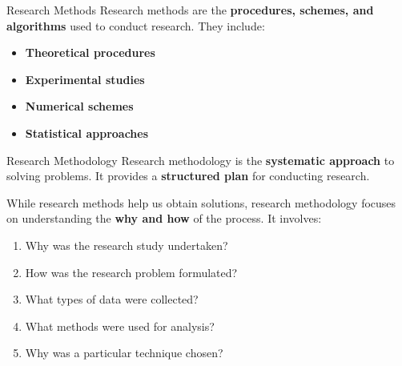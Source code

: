 \begin{frame}{Research Methods}
  Research methods are the \textbf{procedures, schemes, and algorithms} used
  to conduct research. They include:
  \begin{itemize}
    \item \textbf{Theoretical procedures}
    \item \textbf{Experimental studies}
    \item \textbf{Numerical schemes}
    \item \textbf{Statistical approaches}
  \end{itemize}
\end{frame}

\begin{frame}{Research Methodology}
  Research methodology is the \textbf{systematic approach} to solving problems.
  It provides a \textbf{structured plan} for conducting research.

  While research methods help us obtain solutions, research methodology focuses
  on understanding the \textbf{why and how} of the process. It involves:
  \begin{enumerate}
    \item Why was the research study undertaken?
    \item How was the research problem formulated?
    \item What types of data were collected?
    \item What methods were used for analysis?
    \item Why was a particular technique chosen?
  \end{enumerate}
\end{frame}
